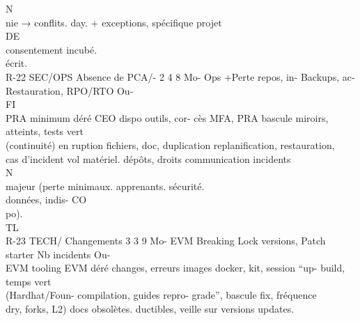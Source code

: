 N\\
nie → conflits.                         day.              +       exceptions, spécifique projet\\
\vspace{0.5em}
\vspace{0.5em}
\vspace{0.5em}
\vspace{0.5em}
DE\\
consentement       incubé.\\
écrit.\\
R-22   SEC/OPS Absence de PCA/- 2 4 8        Mo- Ops      +Perte repos, in- Backups,       ac- Restauration,   RPO/RTO       Ou-\\
\vspace{0.5em}
\vspace{0.5em}
\vspace{0.5em}
\vspace{0.5em}
FI\\
PRA     minimum               déré CEO      dispo outils, cor- cès MFA, PRA bascule miroirs, atteints, tests vert\\
(continuité)    en                          ruption fichiers, doc, duplication replanification, restauration,\\
cas     d’incident                          vol matériel.      dépôts,   droits communication incidents\\
\vspace{0.5em}
\vspace{0.5em}
\vspace{0.5em}
\vspace{0.5em}
N\\
majeur      (perte                                             minimaux.        apprenants.     sécurité.\\
données,     indis-                                                                            CO\\
po).\\
TL\\
R-23   TECH/     Changements     3 3 9       Mo- EVM        Breaking         Lock   versions, Patch       starter Nb incidents Ou-\\
EVM       tooling    EVM              déré           changes, erreurs images docker, kit, session “up- build, temps vert\\
(Hardhat/Foun-                             compilation,     guides     repro- grade”, bascule fix, fréquence\\
dry, forks, L2)                            docs obsolètes. ductibles, veille sur       versions updates.\\
